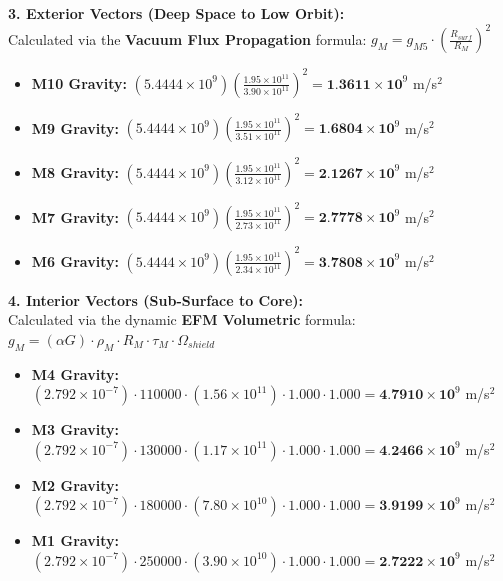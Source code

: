 \documentclass[11pt, a4paper]{article}
\begin{document}
  \clearpage
  \noindent \textbf{3. Exterior Vectors (Deep Space to Low Orbit):} \\
  \hspace*{1em} Calculated via the \textbf{Vacuum Flux Propagation} formula: $g_M = g_{M5} \cdot \left( \frac{R_{surf}}{R_M} \right)^2$
  \begin{itemize}
    \item \textbf{M10 Gravity:} $(5.4444 \times 10^9) \left( \frac{1.95 \times 10^{11}}{3.90 \times 10^{11}} \right)^2 = \textbf{1.3611} \times \textbf{10}^9$ m/s$^2$
    \item \textbf{M9 Gravity:} $(5.4444 \times 10^9) \left( \frac{1.95 \times 10^{11}}{3.51 \times 10^{11}} \right)^2 = \textbf{1.6804} \times \textbf{10}^9$ m/s$^2$
    \item \textbf{M8 Gravity:} $(5.4444 \times 10^9) \left( \frac{1.95 \times 10^{11}}{3.12 \times 10^{11}} \right)^2 = \textbf{2.1267} \times \textbf{10}^9$ m/s$^2$
    \item \textbf{M7 Gravity:} $(5.4444 \times 10^9) \left( \frac{1.95 \times 10^{11}}{2.73 \times 10^{11}} \right)^2 = \textbf{2.7778} \times \textbf{10}^9$ m/s$^2$
    \item \textbf{M6 Gravity:} $(5.4444 \times 10^9) \left( \frac{1.95 \times 10^{11}}{2.34 \times 10^{11}} \right)^2 = \textbf{3.7808} \times \textbf{10}^9$ m/s$^2$
  \end{itemize}

  \vspace{0.5em}
  \noindent \textbf{4. Interior Vectors (Sub-Surface to Core):} \\[0.5em]
  \hspace*{1em} Calculated via the dynamic \textbf{EFM Volumetric} formula: $g_M = (\alpha G) \cdot \rho_{M} \cdot R_M \cdot \tau_M \cdot \Omega_{shield}$
  \begin{itemize}
    \item \textbf{M4 Gravity:} $(2.792 \times 10^{-7}) \cdot 110000 \cdot (1.56 \times 10^{11}) \cdot 1.000 \cdot 1.000 = \textbf{4.7910} \times \textbf{10}^9$ m/s$^2$
    \item \textbf{M3 Gravity:} $(2.792 \times 10^{-7}) \cdot 130000 \cdot (1.17 \times 10^{11}) \cdot 1.000 \cdot 1.000 = \textbf{4.2466} \times \textbf{10}^9$ m/s$^2$
    \item \textbf{M2 Gravity:} $(2.792 \times 10^{-7}) \cdot 180000 \cdot (7.80 \times 10^{10}) \cdot 1.000 \cdot 1.000 = \textbf{3.9199} \times \textbf{10}^9$ m/s$^2$
    \item \textbf{M1 Gravity:} $(2.792 \times 10^{-7}) \cdot 250000 \cdot (3.90 \times 10^{10}) \cdot 1.000 \cdot 1.000 = \textbf{2.7222} \times \textbf{10}^9$ m/s$^2$
  \end{itemize}
\end{document}
